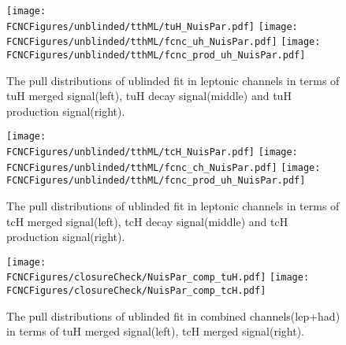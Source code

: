 \begin{figure}[H]
\centering
\texttt{[image: \\FCNCFigures/unblinded/tthML/tuH\_NuisPar.pdf]}
\texttt{[image: \\FCNCFigures/unblinded/tthML/fcnc\_uh\_NuisPar.pdf]}
\texttt{[image: \\FCNCFigures/unblinded/tthML/fcnc\_prod\_uh\_NuisPar.pdf]}
\caption{The pull distributions of ublinded fit in leptonic channels in terms of tuH merged signal(left), tuH decay signal(middle) and tuH production signal(right).}
\label{fig:tuH_NuisPar_unblind_lep}
\end{figure}

\begin{figure}[H]
\centering
\texttt{[image: \\FCNCFigures/unblinded/tthML/tcH\_NuisPar.pdf]}
\texttt{[image: \\FCNCFigures/unblinded/tthML/fcnc\_ch\_NuisPar.pdf]}
\texttt{[image: \\FCNCFigures/unblinded/tthML/fcnc\_prod\_uh\_NuisPar.pdf]}
\caption{The pull distributions of ublinded fit in leptonic channels in terms of tcH merged signal(left), tcH decay signal(middle) and tcH production signal(right).}
\label{fig:tcH_NuisPar_unblind_lep}
\end{figure}




\begin{figure}[H]
\centering
\texttt{[image: \\FCNCFigures/closureCheck/NuisPar\_comp\_tuH.pdf]}
\texttt{[image: \\FCNCFigures/closureCheck/NuisPar\_comp\_tcH.pdf]}
\caption{The pull distributions of ublinded fit in combined channels(lep+had) in terms of tuH merged signal(left), tcH merged signal(right).}
\label{fig:NuisPar_unblind_lep_had}
\end{figure}



